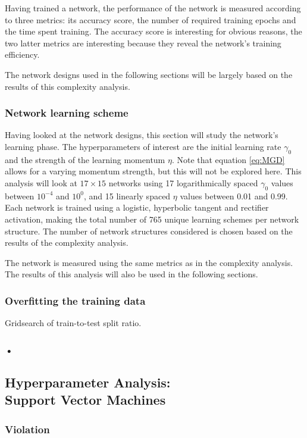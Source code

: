 \documentclass[nofootinbib,reprint,english]{revtex4-1}
\begin{document}
Having trained a network, the performance of the network is measured according to three metrics: its accuracy score, the number of required training epochs and the time spent training. The accuracy score is interesting for obvious reasons, the two latter metrics are interesting because they reveal the network's training efficiency.

The network designs used in the following sections will be largely based on the results of this complexity analysis.
\subsubsection{Network learning scheme}
Having looked at the network designs, this section will study the network's learning phase. The hyperparameters of interest are the initial learning rate \(\gamma_0\) and the strength of the learning momentum \(\eta\). Note that equation \eqref{eq:MGD} allows for a varying momentum strength, but this will not be explored here. This analysis will look at \(17\times15\) networks using 17 logarithmically spaced \(\gamma_0\) values between \(10^{-4}\) and \(10^0\), and 15 linearly spaced \(\eta\) values between 0.01 and 0.99. Each network is trained using a logistic, hyperbolic tangent and rectifier activation, making the total number of 765 unique learning schemes per network structure. The number of network structures considered is chosen based on the results of the complexity analysis.

The network is measured using the same metrics as in the complexity analysis. The results of this analysis will also be used in the following sections.
\subsubsection{Overfitting the training data}\label{sec:NN:train_to_test_split}


Gridsearch of train-to-test split ratio.
\subsubsection{•}


\subsection{Hyperparameter Analysis:\\Support Vector Machines}
\subsubsection{Violation}
\end{document}
